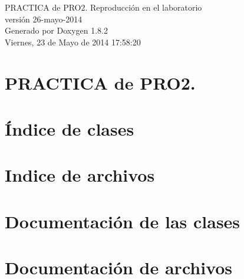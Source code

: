 \documentclass{book}
\begin{document}
\hypersetup{pageanchor=false,citecolor=blue}
\begin{titlepage}
\vspace*{7cm}
\begin{center}
{\Large P\-R\-A\-C\-T\-I\-C\-A de P\-R\-O2. Reproducción en el laboratorio \\[1ex]\large versión 26-\/mayo-\/2014 }\\
\vspace*{1cm}
{\large Generado por Doxygen 1.8.2}\\
\vspace*{0.5cm}
{\small Viernes, 23 de Mayo de 2014 17:58:20}\\
\end{center}
\end{titlepage}
\clearemptydoublepage
{}
\tableofcontents
\clearemptydoublepage
{}
\hypersetup{pageanchor=true,citecolor=blue}
\chapter{P\-R\-A\-C\-T\-I\-C\-A de P\-R\-O2.}
\label{index}\hypertarget{index}{}
\chapter{Índice de clases}

\chapter{Indice de archivos}

\chapter{Documentación de las clases}




\chapter{Documentación de archivos}









\printindex
\end{document}
